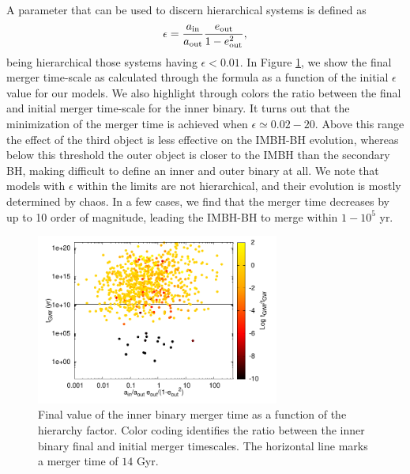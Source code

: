 \documentclass[twocolumn]{aastex62}
\newcommand{\inn}{{\rm in}}
\newcommand{\out}{{\rm out}}
\begin{document}
A parameter that can be used to discern hierarchical systems is defined as \citep{Lithwick11,naoz11}
\begin{equation}
\epsilon = \frac{a_{\inn}}{a_{\out}}\frac{e_{\out}}{1-e_{\out}^2},
\end{equation}
being hierarchical those systems having $\epsilon<0.01$. In Figure \ref{F2}, we show the final merger time-scale as calculated through the \cite{peters64} formula as a function of the initial $\epsilon$ value for our models. We also highlight through colors the ratio between the final and initial merger time-scale for the inner binary. It turns out that the minimization of the merger time is achieved when $\epsilon \simeq 0.02-20$. Above this range the effect of the third object is less effective on the IMBH-BH evolution, whereas below this threshold the outer object is closer to the IMBH than the secondary BH, making difficult to define an inner and outer binary at all. We note that models with $\epsilon$ within the limits are not hierarchical, and their evolution is mostly determined by chaos. In a few cases, we find that the merger time decreases by up to 10 order of magnitude, leading the IMBH-BH to merge within $1 - 10^5$ yr.  

\begin{figure}
\centering
\includegraphics[width=8cm]{merger_hierarchy}
\caption{Final value of the inner binary merger time as a function of the hierarchy factor. Color coding identifies the ratio between the inner binary final and initial merger timescales. The horizontal line marks a merger time of $14$ Gyr.}
\label{F2}
\end{figure}
\end{document}
